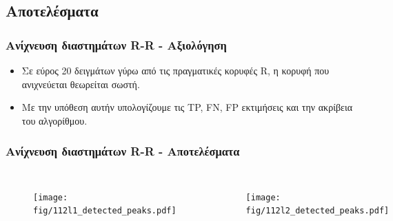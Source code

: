 \documentclass{beamer}
\begin{document}
\subsection{Αποτελέσματα}
\begin{frame}
\frametitle{Ανίχνευση διαστημάτων R-R - Αξιολόγηση}

\begin{itemize}
\item Σε εύρος 20 δειγμάτων γύρω από τις πραγματικές κορυφές R, η κορυφή που ανιχνεύεται 	θεωρείται σωστή.
\item Με την υπόθεση αυτήν υπολογίζουμε τις TP, FN, FP εκτιμήσεις και την ακρίβεια του αλγορίθμου.
\end{itemize}

\centering
\begin{table}[H]

\end{table}

\end{frame}


\begin{frame}
\frametitle{Ανίχνευση διαστημάτων R-R - Αποτελέσματα}

\centering
\begin{columns}
\begin{figure}
\texttt{[image: fig/112l1\_detected\_peaks.pdf]}
\end{figure}

\begin{figure}
\texttt{[image: fig/112l2\_detected\_peaks.pdf]}
\end{figure}
\end{columns}
\end{frame}
\end{document}
